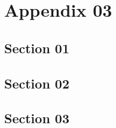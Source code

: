 \chapter{Appendix 03}
\section{Section 01}
\lipsum[1-3]
\section{Section 02}
\lipsum[1-3]
\section{Section 03}
\lipsum[1-3]